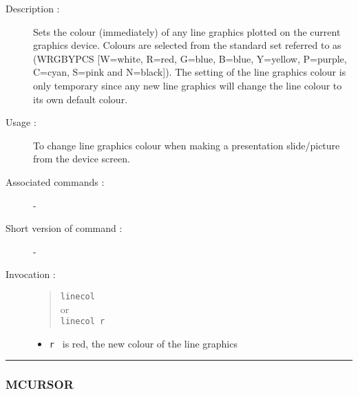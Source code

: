 \begin{description}

\item[Description :] Sets the colour (immediately) of any line graphics
plotted on the current graphics device.  Colours are selected from the
standard set referred to as (WRGBYPCS [W=white, R=red, G=blue, B=blue,
Y=yellow, P=purple, C=cyan, S=pink and N=black]).  The setting of the
line graphics colour is only temporary since any new line graphics will
change the line colour to its own default colour.

\item[Usage :] To change line graphics colour when making a
presentation slide/picture from the device screen.
\item[Associated commands :] -
\item[Short version of command :] -
\item[Invocation :]

\begin{quote}{\tt  linecol }\\
or \\
{\tt linecol r }
\end{quote}

\begin{itemize}

\item {\tt r } is red, the new colour of the line graphics
\end{itemize}

\end{description}

\hrule
\subsubsection*{\label{MCURSOR}MCURSOR}


